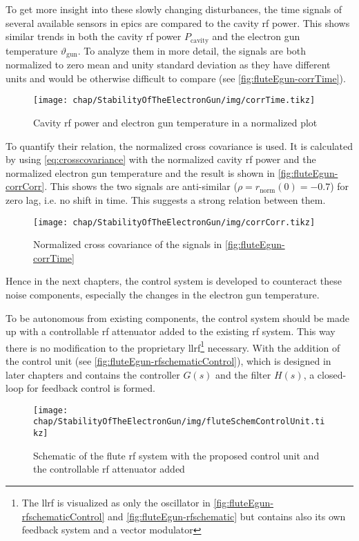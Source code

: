 To get more insight into these slowly changing disturbances, the time signals of several available sensors in \gls{epics} are compared to the cavity \gls{rf} power. This shows similar trends in both the cavity \gls{rf} power $P_\text{cavity}$ and the electron gun temperature $\vartheta_\text{gun}$. To analyze them in more detail, the signals are both normalized to zero mean and unity standard deviation as they have different units and would be otherwise difficult to compare (see \autoref{fig:fluteEgun-corrTime}).

\begin{figure}[tb]
	\centering
	\texttt{[image: chap/StabilityOfTheElectronGun/img/corrTime.tikz]}
	\caption[Normalized cavity power and gun temperature]{Cavity \gls{rf} power and electron gun temperature in a normalized plot}
	\label{fig:fluteEgun-corrTime}
\end{figure}

To quantify their relation, the normalized cross covariance is used. It is calculated by using \autoref{eq:crosscovariance} with the normalized cavity \gls{rf} power and the normalized electron gun temperature and the result is shown in \autoref{fig:fluteEgun-corrCorr}. This shows the two signals are anti-similar ($\rho=r_\text{norm}(0)=-0.7$) for zero lag, i.e. no shift in time. This suggests a strong relation between them.

\begin{figure}[tb]
	\centering
	\texttt{[image: chap/StabilityOfTheElectronGun/img/corrCorr.tikz]}
	\caption[Cross covariance analysis of cavity power and gun temperature]{Normalized cross covariance of the signals in \autoref{fig:fluteEgun-corrTime}}
	\label{fig:fluteEgun-corrCorr}
\end{figure}

Hence in the next chapters, the control system is developed to counteract these noise components, especially the changes in the electron gun temperature. 

To be autonomous from existing components, the control system should be made up with a controllable \gls{rf} attenuator added to the existing \gls{rf} system. This way there is no modification to the proprietary \gls{llrf}\footnote{The \gls{llrf} is visualized as only the oscillator in \autoref{fig:fluteEgun-rfschematicControl} and \autoref{fig:fluteEgun-rfschematic} but contains also its own feedback system and a vector modulator} necessary. With the addition of the control unit (see \autoref{fig:fluteEgun-rfschematicControl}), which is designed in later chapters and contains the controller $G(s)$ and the filter $H(s)$, a closed-loop for feedback control is formed.

\begin{figure}[tb]
	\centering
	\texttt{[image: chap/StabilityOfTheElectronGun/img/fluteSchemControlUnit.tikz]}
	\caption[FLUTE RF schematic with control unit]{Schematic of the \gls{flute} \gls{rf} system with the proposed control unit and the controllable \gls{rf} attenuator added}
	\label{fig:fluteEgun-rfschematicControl}
\end{figure}






